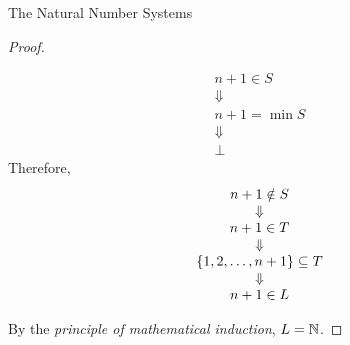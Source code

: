 \begin{section}{The Natural Number Systems}
\begin{proof}
\begin{itemize}
        \[
        \begin{array}{c}
            n + 1 \in S \\
            \Downarrow \\
            n + 1 = \min S \\
            \Downarrow \\
            \bot
        \end{array}
        \]
        Therefore,
        \[
        \begin{array}{c}
            n + 1 \notin S \\
            \Downarrow \\
            n + 1 \in T \\
            \Downarrow \\
            \set*{1, 2, \dots, n + 1} \subseteq T \\
            \Downarrow \\
            n + 1 \in L
        \end{array}
        \]
    \end{itemize}
    By the \emph{principle of mathematical induction}, $L = \N$.
\end{proof}

\end{section}